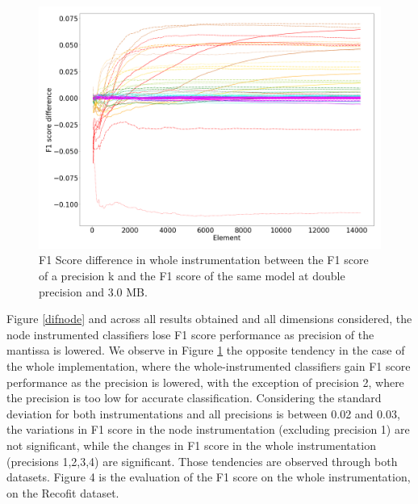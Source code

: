 \documentclass[conference]{IEEEtran}
\begin{document}
\begin{figure}[htbp]
    \centerline{\includegraphics[width=\linewidth]{difwhole11.png}}
    \caption{
        F1 Score difference in whole instrumentation between the F1 score of a
        precision k and the F1 score of the same model at double precision and 3.0
        MB.}
    \label{difwhole}
\end{figure}

Figure \ref{difnode} and across all results obtained and all dimensions
considered, the node instrumented classifiers lose F1 score performance as
precision of the mantissa is lowered. We observe in Figure \ref{difwhole} the
opposite tendency in the case of the whole implementation, where the
whole-instrumented classifiers gain F1 score performance as the precision is
lowered, with the exception of precision 2, where the precision is too low for
accurate classification. Considering the standard deviation for both
instrumentations and all precisions is between 0.02 and 0.03, the variations in
F1 score in the node instrumentation (excluding precision 1) are not
significant, while the changes in F1 score in the whole instrumentation
(precisions 1,2,3,4) are significant. Those tendencies are observed through both
datasets. Figure 4 is the evaluation of the F1 score on the whole
instrumentation, on the Recofit dataset.
\end{document}
